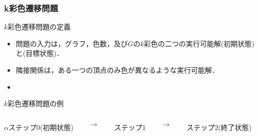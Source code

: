 \documentclass[dvipdfmx,11pt]{beamer}
\begin{document}
\begin{frame}\frametitle{k彩色遷移問題}

  \begin{block}{$k$彩色遷移問題の定義}
    \begin{itemize}
      \item 問題の入力は，グラフ，色数，及び$G$の$k$彩色の二つの実行可能解\structure{$\alpha$}(初期状態)と\structure{$\beta$}(目標状態)．
      \item 隣接関係は，ある一つの頂点のみ色が異なるような実行可能解．
      \item {}
    \end{itemize}
  \end{block}

  \begin{exampleblock}{$k$彩色遷移問題の例}
    \begin{columns}
      \begin{column}{0.3\textwidth}
        \centering
        
        $\alpha$ステップ0(初期状態)
      \end{column}
      \begin{column}{0.05\textwidth}
        \textbf{$\longrightarrow$}
      \end{column}
      \begin{column}[]{0.3\textwidth}
        \centering
        
        ステップ1
      \end{column}
      \begin{column}{0.05\textwidth}
        \textbf{$\longrightarrow$}
      \end{column}
      \begin{column}{0.3\textwidth}
        \centering
        
        ステップ2(終了状態)
      \end{column}
    \end{columns}
  \end{exampleblock}
  
\end{frame}

\end{document}
